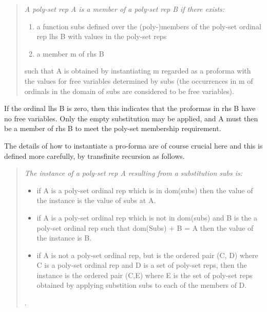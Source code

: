 \documentclass[numreferences]{rbjk}
\begin{document}
\begin{article}
\begin{quotation}
{\it
A poly-set rep A is a member of a poly-set rep B if there exists:
\begin{enumerate}
\item a function \textsf{subs} defined over the (poly-)members of the poly-set ordinal rep \textsf{lhs B} with values in the poly-set reps
\item a member \textsf{m} of \textsf{rhs B}
\end{enumerate}
such that A is obtained by instantiating \textsf{m} regarded as a proforma with the values for free variables determined by \textsf{subs} (the occurrences in \textsf{m} of ordinals in the domain of \textsf{subs} are considered to be free variables).
}
\end{quotation}

If the ordinal \textsf{lhs B} is zero, then this indicates that the proformas in \textsf{rhs B} have no free variables.
Only the empty substitution may be applied, and \textsf{A} must then be a member of \textsf{rhs B} to meet the poly-set membership requirement.

The details of how to instantiate a pro-forma are of course crucial here and this is defined more carefully, by transfinite recursion as follows.

\begin{quote}
{\it
The instance of a poly-set rep \textsf{A} resulting from a substitution \textsf{subs} is:
\begin{itemize}

\item if \textsf{A} is a poly-set ordinal rep which is in \textsf{dom(subs)} then the value of the instance is the value of \textsf{subs} at \textsf{A}.

\item if \textsf{A} is a poly-set ordinal rep which is not in \textsf{dom(subs)} and \textsf{B} is the a poly-set ordinal rep such that \textsf{dom(Subs) + B = A} then the value of the instance is \textsf{B}.

\item if \textsf{A} is not a poly-set ordinal rep, but is the ordered pair \textsf{(C, D)} where \textsf{C} is a poly-set ordinal rep and \textsf{D} is a set of poly-set reps, then the instance is the ordered pair \textsf{(C,E)} where E is the set of poly-set reps obtained by applying substition \textsf{subs} to each of the members of \textsf{D}.
\end{itemize}.
}
\end{quote}


\end{article}
\end{document}
